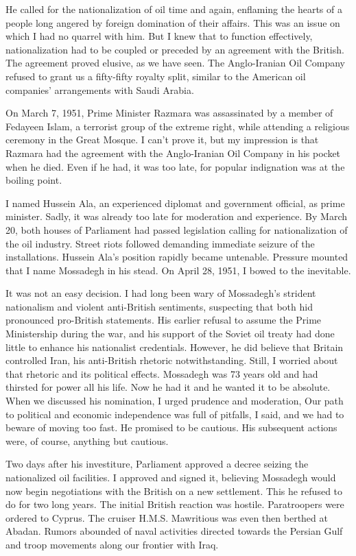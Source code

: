 He called for the nationalization of oil time and again, enflaming the hearts of a people long angered by foreign domination of their affairs. This was an issue on which I had no quarrel with him. But I knew that to function effectively, nationalization had to be coupled or preceded by an agreement with the British. The agreement proved elusive, as we have seen. The Anglo-Iranian Oil Company refused to grant us a fifty-fifty royalty split, similar to the American oil companies’ arrangements with Saudi Arabia. 

On March 7, 1951, Prime Minister Razmara was assassinated by a member of Fedayeen Islam, a terrorist group of the extreme right, while attending a religious ceremony in the Great Mosque. I can't prove it, but my impression is that Razmara had the agreement with the Anglo-Iranian Oil Company in his pocket when he died. Even if he had, it was too late, for popular indignation was at the boiling point. 

I named Hussein Ala, an experienced diplomat and government official, as prime minister. Sadly, it was already too late for moderation and experience. By March 20, both houses of Parliament had passed legislation calling for nationalization of the oil industry. Street riots followed demanding immediate seizure of the installations. Hussein Ala’s position rapidly became untenable. Pressure mounted that I name Mossadegh in his stead. On April 28, 1951, I bowed to the inevitable. 

It was not an easy decision. I had long been wary of Mossadegh’s strident nationalism and violent anti-British sentiments, suspecting that both hid pronounced pro-British statements. His earlier refusal to assume the Prime Ministership during the war, and his support of the Soviet oil treaty had done little to enhance his nationalist credentials. However, he did believe that Britain controlled Iran, his anti-British rhetoric notwithstanding. Still, I worried about that rhetoric and its political effects. Mossadegh was 73 years old and had thirsted for power all his life. Now he had it and he wanted it to be absolute. When we discussed his nomination, I urged prudence and moderation, Our path to political and economic independence was full of pitfalls, I said, and we had to beware of moving too fast. He promised to be cautious. His subsequent actions were, of course, anything but cautious. 

Two days after his investiture, Parliament approved a decree seizing the nationalized oil facilities. I approved and signed it, believing Mossadegh would now begin negotiations with the British on a new settlement. This he refused to do for two long years. The initial British reaction was hostile. Paratroopers were ordered to Cyprus. The cruiser H.M.S. Mawritious was even then berthed at Abadan. Rumors abounded of naval activities directed towards the Persian Gulf and troop movements along our frontier with Iraq. 

